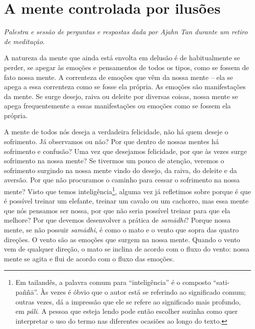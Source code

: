 
\chapter{A mente controlada por ilusões}

{\itshape
Palestra e sessão de perguntas e respostas dada por Ajahn Tan durante um
retiro de meditação.}

A natureza da mente que ainda está envolta em delusão é de
habitualmente se perder, se apegar às emoções e pensamentos de todos os
tipos, como se fossem de fato nossa mente. A correnteza de emoções que
vêm da nossa mente – ela se apega a essa correnteza como se fosse ela
própria. As emoções são manifestações da mente. Se surge desejo, raiva
ou deleite por diversas coisas, nossa mente se apega frequentemente a
essas manifestações ou emoções como se fossem ela própria.

A mente de todos nós deseja a verdadeira felicidade, não há quem
deseje o sofrimento. Já observamos ou não? Por que dentro de nossas
mentes há sofrimento e confusão? Uma vez que desejamos felicidade, por
que às vezes surge sofrimento na nossa mente? Se tivermos um pouco de
atenção, veremos o sofrimento surgindo na nossa mente vindo do desejo,
da raiva, do deleite e da aversão. Por que não procuramos o caminho
para cessar o sofrimento na nossa mente? Visto que temos
inteligência\footnote{Em tailandês, a palavra comum para “inteligência”
é o composto “sati-paññā”. Às vezes é óbvio que o autor está se
referindo ao significado comum; outras vezes, dá a impressão que ele se
refere ao significado mais profundo, em \textit{páli}. A pessoa que
esteja lendo pode então escolher sozinha como quer interpretar o uso do
termo nas diferentes ocasiões ao longo do texto.}, alguma vez já
refletimos sobre porque é que é possível treinar um elefante, treinar
um cavalo ou um cachorro, mas essa mente que nós pensamos ser nossa,
por que não seria possível treinar para que ela melhore? Por que
devemos desenvolver a prática de \textit{samādhi}? Porque nossa
mente, se não possuir \textit{samādhi}, é como o mato e o vento que
sopra das quatro direções. O vento são as emoções que surgem na nossa
mente. Quando o vento vem de qualquer direção, o mato se inclina de
acordo com o fluxo do vento: nossa mente se agita e flui de acordo com
o fluxo das emoções.

